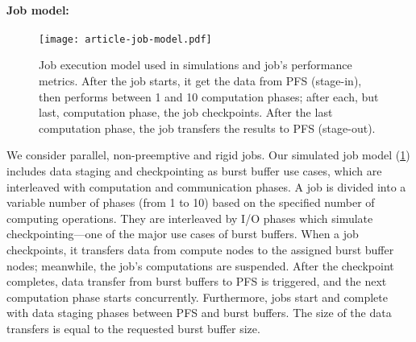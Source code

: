 \documentclass[runningheads]{llncs}
\begin{document}

\paragraph{Job model:}
\begin{figure}[tb]
  \setlength{}
  \centering
  \texttt{[image: article-job-model.pdf]}
  \caption{Job execution model used in simulations and job's performance metrics. After the job starts, it get the data from PFS (stage-in), then performs between 1 and 10 computation phases; after each, but last, computation phase, the job checkpoints. After the last computation phase, the job transfers the results to PFS (stage-out).}
  \label{fig:job-model}
\end{figure}
We consider parallel, non-preemptive and rigid jobs. Our simulated job model (\cref{fig:job-model}) includes data staging and checkpointing as burst buffer use cases, which are interleaved with computation and communication phases. A job is divided into a variable number of phases (from 1 to 10) based on the specified number of computing operations. They are interleaved by I/O phases which simulate checkpointing---one of the major use cases of burst buffers. When a job checkpoints, it transfers data from compute nodes to the assigned burst buffer nodes; meanwhile, the job's computations are suspended. After the checkpoint completes, data transfer from burst buffers to PFS is triggered, and the next computation phase starts concurrently. Furthermore, jobs start and complete with data staging phases between PFS and burst buffers.
The size of the data transfers is equal to the requested burst buffer size. 
\end{document}
